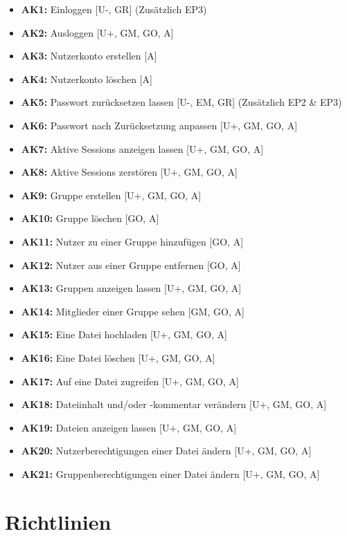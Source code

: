\documentclass[fontsize=12pt,DIV=14,BCOR=10mm,a4paper,parskip=half-,english,ngerman,bibliography=totocnumbered]{scrreprt}
\begin{document}
\begin{itemize}
  \item \textbf{AK1:} Einloggen [U-, GR] (Zusätzlich EP3)
  \item \textbf{AK2:} Ausloggen [U+, GM, GO, A]
  \item \textbf{AK3:} Nutzerkonto erstellen [A]
  \item \textbf{AK4:} Nutzerkonto löschen [A]
  \item \textbf{AK5:} Passwort zurücksetzen lassen [U-, EM, GR] (Zusätzlich EP2 \& EP3)
  \item \textbf{AK6:} Passwort nach Zurücksetzung anpassen [U+, GM, GO, A]
  \item \textbf{AK7:} Aktive Sessions anzeigen lassen [U+, GM, GO, A]
  \item \textbf{AK8:} Aktive Sessions zerstören [U+, GM, GO, A]
  \item \textbf{AK9:} Gruppe erstellen [U+, GM, GO, A]
  \item \textbf{AK10:} Gruppe löschen [GO, A]
  \item \textbf{AK11:} Nutzer zu einer Gruppe hinzufügen [GO, A]
  \item \textbf{AK12:} Nutzer aus einer Gruppe entfernen [GO, A]
  \item \textbf{AK13:} Gruppen anzeigen lassen [U+, GM, GO, A]
  \item \textbf{AK14:} Mitglieder einer Gruppe sehen [GM, GO, A]
  \item \textbf{AK15:} Eine Datei hochladen [U+, GM, GO, A]
  \item \textbf{AK16:} Eine Datei löschen [U+, GM, GO, A]
  \item \textbf{AK17:} Auf eine Datei zugreifen [U+, GM, GO, A]
  \item \textbf{AK18:} Dateiinhalt und/oder -kommentar verändern [U+, GM, GO, A]
  \item \textbf{AK19:} Dateien anzeigen lassen [U+, GM, GO, A]
  \item \textbf{AK20:} Nutzerberechtigungen einer Datei ändern [U+, GM, GO, A]
  \item \textbf{AK21:} Gruppenberechtigungen einer Datei ändern [U+, GM, GO, A]
\end{itemize}

\chapter{Richtlinien}
\end{document}

